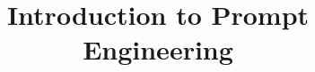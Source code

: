 \documentclass[xcolor=dvipsnames,compress,t,pdf,9pt]{beamer}
\title[\insertframenumber /\inserttotalframenumber]{Introduction to Prompt Engineering}
\begin{document}
	\begin{frame}
	\titlepage
	\end{frame}
	
	
\end{document}

